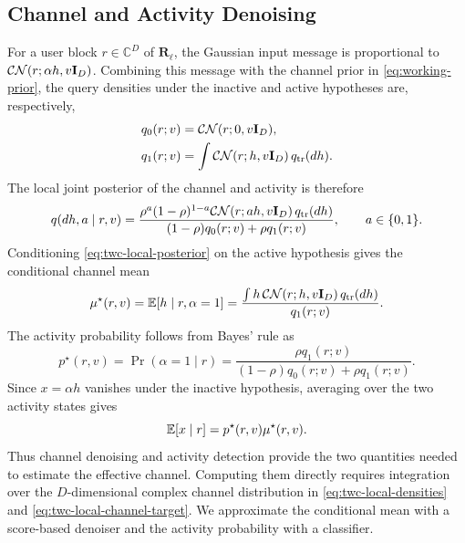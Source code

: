 \subsection{Channel and Activity Denoising}

For a user block $r\in\mathbb C^D$ of $\mathbf R_\ell$, the Gaussian
input message is proportional to $\mathcal{CN}(r;\alpha h,v\mathbf{I}_D)$.
Combining this message with the channel prior in
\eqref{eq:working-prior}, the query densities under the inactive
and active hypotheses are, respectively,
\begin{equation}
 \begin{aligned}
 q_0(r;v)&=\mathcal{CN}(r;0,v\mathbf{I}_D),\\
 q_1(r;v)&=\int\mathcal{CN}(r;h,v\mathbf{I}_D)\,q_{\rm tr}(dh).
 \end{aligned}
 \label{eq:twc-local-densities}
\end{equation}
The local joint posterior of the channel and activity is therefore
\begin{equation}
 q(dh,a\mid r,v)=
 \frac{\rho^a(1-\rho)^{1-a}\mathcal{CN}(r;ah,v\mathbf{I}_D)\,q_{\rm tr}(dh)}
 {(1-\rho)q_0(r;v)+\rho q_1(r;v)},\qquad a\in\{0,1\}.
 \label{eq:twc-local-posterior}
\end{equation}
Conditioning \eqref{eq:twc-local-posterior} on the active hypothesis
gives the conditional channel mean
\begin{equation}
 \mu^\star(r,v)=\mathbb{E}[h\mid r,\alpha=1]
 =\frac{\int h\,\mathcal{CN}(r;h,v\mathbf{I}_D)\,q_{\rm tr}(dh)}{q_1(r;v)}.
 \label{eq:twc-local-channel-target}
\end{equation}
The activity probability follows from Bayes' rule as
\begin{equation}
 p^\star(r,v)=\Pr(\alpha=1\mid r)
 =\frac{\rho q_1(r;v)}
 {(1-\rho)q_0(r;v)+\rho q_1(r;v)}.
 \label{eq:twc-local-activity-target}
\end{equation}
Since $x=\alpha h$ vanishes under the inactive hypothesis, averaging
over the two activity states gives \cite[eq.~(35)]{cai2026}
\begin{equation}
 \mathbb{E}[x\mid r]=p^\star(r,v)\mu^\star(r,v).
 \label{eq:twc-mixture-mean}
\end{equation}
Thus channel denoising and activity detection provide the two
quantities needed to estimate the effective channel. Computing them
directly requires integration over the $D$-dimensional complex channel
distribution in \eqref{eq:twc-local-densities} and
\eqref{eq:twc-local-channel-target}. We approximate the conditional
mean with a score-based denoiser and the activity probability with
a classifier.

